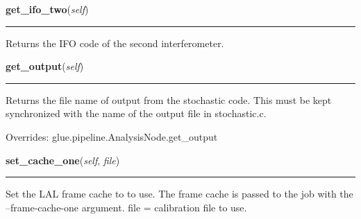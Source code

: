     \label{stochastic:StochasticNode:get_ifo_two}
    \vspace{0.5ex}

    \begin{boxedminipage}{\textwidth}

    \raggedright \textbf{get\_ifo\_two}(\textit{self})

    \vspace{-1.5ex}

    \rule{\textwidth}{0.5\fboxrule}
    Returns the IFO code of the second interferometer.

    \vspace{1ex}

    \end{boxedminipage}

    \label{stochastic:StochasticNode:get_output}
    \vspace{0.5ex}

    \begin{boxedminipage}{\textwidth}

    \raggedright \textbf{get\_output}(\textit{self})

    \vspace{-1.5ex}

    \rule{\textwidth}{0.5\fboxrule}
    Returns the file name of output from the stochastic code. This must 
    be kept synchronized with the name of the output file in 
    stochastic.c.

    \vspace{1ex}

      Overrides: glue.pipeline.AnalysisNode.get\_output

    \end{boxedminipage}

    \label{stochastic:StochasticNode:set_cache_one}
    \vspace{0.5ex}

    \begin{boxedminipage}{\textwidth}

    \raggedright \textbf{set\_cache\_one}(\textit{self}, \textit{file})

    \vspace{-1.5ex}

    \rule{\textwidth}{0.5\fboxrule}
    Set the LAL frame cache to to use. The frame cache is passed to the 
    job with the --frame-cache-one argument. file = calibration file to 
    use.

    \vspace{1ex}

    \end{boxedminipage}


